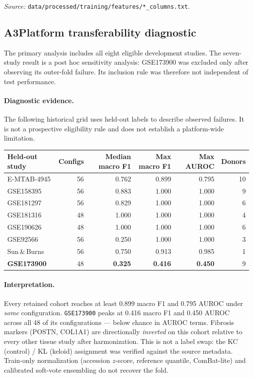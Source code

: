\medskip
\noindent\textit{Source:}
\texttt{data/processed/training/features/*\_columns.txt}.

\subsection*{A3\quad Platform transferability diagnostic}
\label{app:transferability}

The primary analysis includes all eight eligible development studies. The
seven-study result is a post hoc sensitivity analysis: GSE173900 was excluded
only after observing its outer-fold failure. Its inclusion rule was therefore
not independent of test performance.

\paragraph{Diagnostic evidence.} The following historical grid uses held-out
labels to describe observed failures. It is not a prospective eligibility rule
and does not establish a platform-wide limitation.

{\small
\begin{tabular}{@{}lrrrrr@{}}
\toprule
Held-out study & Configs & Median macro F1 & \textbf{Max macro F1} & \textbf{Max AUROC} & Donors \\
\midrule
E-MTAB-4945 & 56 & 0.762 & 0.899 & 0.795 & 10 \\
GSE158395   & 56 & 0.883 & 1.000 & 1.000 & 9 \\
GSE181297   & 56 & 0.829 & 1.000 & 1.000 & 6 \\
GSE181316   & 48 & 1.000 & 1.000 & 1.000 & 4 \\
GSE190626   & 48 & 1.000 & 1.000 & 1.000 & 6 \\
GSE92566    & 56 & 0.250 & 1.000 & 1.000 & 3 \\
Sun\,\&\,Burns & 56 & 0.750 & 0.913 & 0.985 & 1 \\
\midrule
\textbf{GSE173900} & 48 & \textbf{0.325} & \textbf{0.416} & \textbf{0.450} & 9 \\
\bottomrule
\end{tabular}
}

\paragraph{Interpretation.} Every retained cohort reaches at least 0.899 macro
F1 and 0.795 AUROC under \emph{some} configuration. \texttt{GSE173900} peaks at
0.416 macro F1 and 0.450 AUROC across all 48 of its configurations --- below
chance in AUROC terms. Fibrosis markers (POSTN, COL1A1) are directionally
\emph{inverted} on this cohort relative to every other tissue study after
harmonization. This is not a label swap: the KC (control) / KL (keloid)
assignment was verified against the source metadata. Train-only normalization
(accession $z$-score, reference quantile, ComBat-lite) and calibrated soft-vote
ensembling do not recover the fold.

